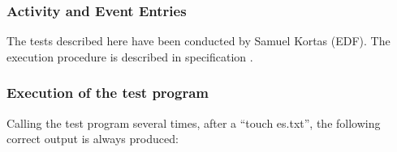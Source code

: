 \subsubsection{Activity and Event Entries}


The tests described here have been conducted by Samuel Kortas (EDF). The
execution procedure is described in specification
.



\subsubsection{Execution of the test program}

Calling the test program several times, after a ``touch es.txt'',
the following correct
 output is always produced:

